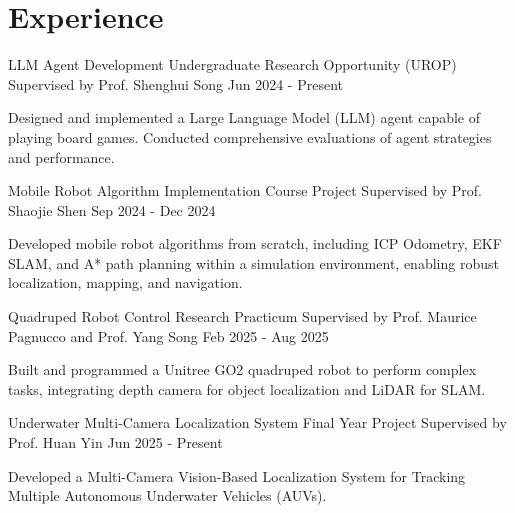 \section{Experience}

\cventry
{LLM Agent Development} %
{Undergraduate Research Opportunity (UROP)} %
{Supervised by Prof. Shenghui Song} %
{Jun 2024 - Present} %
\begin{cvitems}
\item {Designed and implemented a Large Language Model (LLM) agent capable of playing board games. Conducted comprehensive evaluations of agent strategies and performance.}
\end{cvitems}

\cventry
{Mobile Robot Algorithm Implementation} %
{Course Project} %
{Supervised by Prof. Shaojie Shen} %
{Sep 2024 - Dec 2024} %
\begin{cvitems}
\item {Developed mobile robot algorithms from scratch, including ICP Odometry, EKF SLAM, and A* path planning within a simulation environment, enabling robust localization, mapping, and navigation.}
\end{cvitems}

\cventry
{Quadruped Robot Control} %
{Research Practicum} %
{Supervised by Prof. Maurice Pagnucco and Prof. Yang Song} %
{Feb 2025 - Aug 2025} %
\begin{cvitems}
\item {Built and programmed a Unitree GO2 quadruped robot to perform complex tasks, integrating depth camera for object localization and LiDAR for SLAM.}
\end{cvitems}

\cventry
{Underwater Multi-Camera Localization System} %
{Final Year Project} %
{Supervised by Prof. Huan Yin} %
{Jun 2025 - Present} %
\begin{cvitems}
\item {Developed a Multi-Camera Vision-Based Localization System for Tracking Multiple Autonomous Underwater Vehicles (AUVs).}
\end{cvitems}